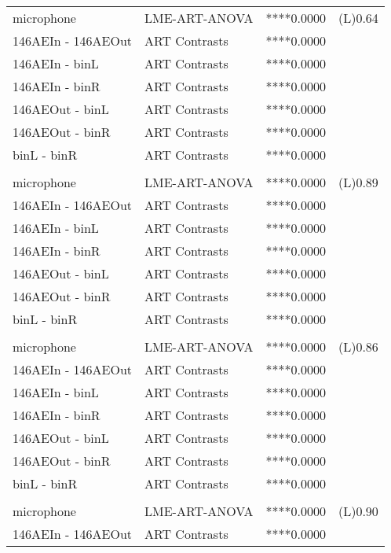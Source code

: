 \begin{table}
\begin{tabular*}{\linewidth}{@{\extracolsep{\fill}}llrl}
\midrule\addlinespace[2.5pt]
\multicolumn{4}{l}{LASmax} \\[2.5pt] 
\midrule\addlinespace[2.5pt]
microphone & LME-ART-ANOVA & ****0.0000 & (L)0.64 \\ 
146AEIn - 146AEOut & ART Contrasts & ****0.0000 &  \\ 
146AEIn - binL & ART Contrasts & ****0.0000 &  \\ 
146AEIn - binR & ART Contrasts & ****0.0000 &  \\ 
146AEOut - binL & ART Contrasts & ****0.0000 &  \\ 
146AEOut - binR & ART Contrasts & ****0.0000 &  \\ 
binL - binR & ART Contrasts & ****0.0000 &  \\ 
\midrule\addlinespace[2.5pt]
\multicolumn{4}{l}{LCS} \\[2.5pt] 
\midrule\addlinespace[2.5pt]
microphone & LME-ART-ANOVA & ****0.0000 & (L)0.89 \\ 
146AEIn - 146AEOut & ART Contrasts & ****0.0000 &  \\ 
146AEIn - binL & ART Contrasts & ****0.0000 &  \\ 
146AEIn - binR & ART Contrasts & ****0.0000 &  \\ 
146AEOut - binL & ART Contrasts & ****0.0000 &  \\ 
146AEOut - binR & ART Contrasts & ****0.0000 &  \\ 
binL - binR & ART Contrasts & ****0.0000 &  \\ 
\midrule\addlinespace[2.5pt]
\multicolumn{4}{l}{LCS10} \\[2.5pt] 
\midrule\addlinespace[2.5pt]
microphone & LME-ART-ANOVA & ****0.0000 & (L)0.86 \\ 
146AEIn - 146AEOut & ART Contrasts & ****0.0000 &  \\ 
146AEIn - binL & ART Contrasts & ****0.0000 &  \\ 
146AEIn - binR & ART Contrasts & ****0.0000 &  \\ 
146AEOut - binL & ART Contrasts & ****0.0000 &  \\ 
146AEOut - binR & ART Contrasts & ****0.0000 &  \\ 
binL - binR & ART Contrasts & ****0.0000 &  \\ 
\midrule\addlinespace[2.5pt]
\multicolumn{4}{l}{LCS50} \\[2.5pt] 
\midrule\addlinespace[2.5pt]
microphone & LME-ART-ANOVA & ****0.0000 & (L)0.90 \\ 
146AEIn - 146AEOut & ART Contrasts & ****0.0000 &  \\ 

\end{tabular*}
\end{table}
